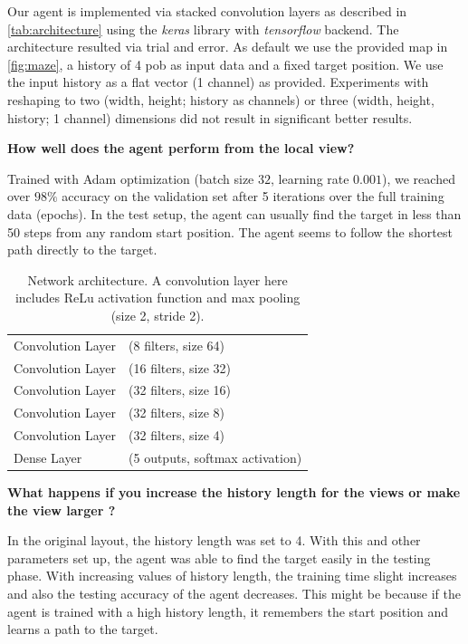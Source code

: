 \documentclass[a4paper,14pt]{article}
\begin{document}
Our agent is implemented via stacked convolution layers as described in
\autoref{tab:architecture} using the \emph{keras} library with \emph{tensorflow} backend.
The architecture resulted via trial and error.
As default we use the provided map in \autoref{fig:maze}, a history of 4 pob as input data
and a fixed target position.
We use the input history as a flat vector (1 channel) as provided.
Experiments with reshaping to two (width, height; history as channels) or three
(width, height, history; 1 channel) dimensions did not result in significant
better results.

\textbf{How well does the agent perform from the local view?}

Trained with Adam optimization (batch size $32$, learning rate $0.001$), we reached over $98\%$
accuracy on the validation set after 5 iterations over the full training data
(epochs).
In the test setup, the agent can usually find the target in less than 50 steps from any random start position. The agent seems to follow the shortest path directly to the target.

\begin{table}[h]
  \centering
  \begin{tabular}{ll}
    \hline
    Convolution Layer & (8 filters, size 64) \\
    Convolution Layer & (16 filters, size 32) \\
    Convolution Layer & (32 filters, size 16) \\
    Convolution Layer & (32 filters, size 8) \\
    Convolution Layer & (32 filters, size 4) \\
    Dense Layer & (5 outputs, softmax activation) \\
    \hline
  \end{tabular}
  \caption{Network architecture. A convolution layer here includes ReLu
    activation function and max pooling (size 2, stride 2).}
  \label{tab:architecture}
\end{table}

\textbf{ What happens if you increase the history length for the views or make the
view larger ?}

In the original layout, the history length was set to 4. With this and other parameters set up, the agent was able to find the target easily in the testing phase. With increasing values of history length, the training time slight increases and also the testing accuracy of the agent decreases.
This might be because if the agent is trained with a high history length, it remembers the start position and learns a path to the target.
\end{document}
